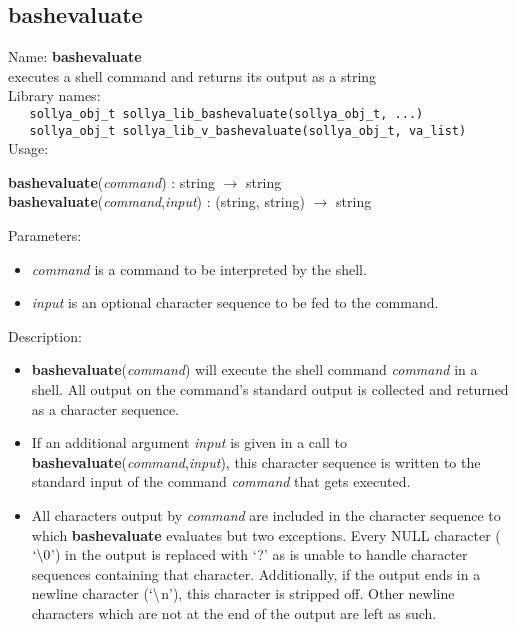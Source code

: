 \subsection{bashevaluate}
\label{labbashevaluate}
\noindent Name: \textbf{bashevaluate}\\
\phantom{aaa}executes a shell command and returns its output as a string\\[0.2cm]
\noindent Library names:\\
\verb|   sollya_obj_t sollya_lib_bashevaluate(sollya_obj_t, ...)|\\
\verb|   sollya_obj_t sollya_lib_v_bashevaluate(sollya_obj_t, va_list)|\\[0.2cm]
\noindent Usage: 
\begin{center}
\textbf{bashevaluate}(\emph{command}) : \textsf{string} $\rightarrow$ \textsf{string}\\
\textbf{bashevaluate}(\emph{command},\emph{input}) : (\textsf{string}, \textsf{string}) $\rightarrow$ \textsf{string}\\
\end{center}
Parameters: 
\begin{itemize}
\item \emph{command} is a command to be interpreted by the shell.
\item \emph{input} is an optional character sequence to be fed to the command.
\end{itemize}
\noindent Description: \begin{itemize}

\item \textbf{bashevaluate}(\emph{command}) will execute the shell command \emph{command} in a shell.
   All output on the command's standard output is collected and returned 
   as a character sequence.

\item If an additional argument \emph{input} is given in a call to
   \textbf{bashevaluate}(\emph{command},\emph{input}), this character sequence is written to the
   standard input of the command \emph{command} that gets executed.

\item All characters output by \emph{command} are included in the character
   sequence to which \textbf{bashevaluate} evaluates but two exceptions. Every NULL
   character ($`\backslash 0$') in the output is replaced with
   `?' as \sollya is unable to handle character sequences containing that
   character. Additionally, if the output ends in a newline character
   ($`\backslash$n'), this character is stripped off. Other
   newline characters which are not at the end of the output are left as
   such.
\end{itemize}
